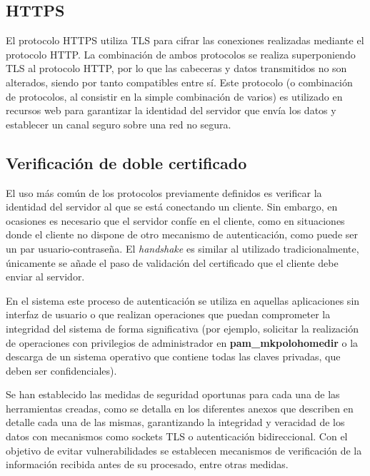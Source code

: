 \subsection{HTTPS}

El protocolo HTTPS\cite{rfc2818} utiliza TLS para cifrar las conexiones realizadas mediante el protocolo HTTP. La combinación de ambos protocolos se realiza superponiendo TLS al protocolo HTTP, por lo que las cabeceras y datos transmitidos no son alterados, siendo por tanto compatibles entre sí. Este protocolo (o combinación de protocolos, al consistir en la simple combinación de varios) es utilizado en recursos web para garantizar la identidad del servidor que envía los datos y establecer un canal seguro sobre una red no segura.

\subsection{Verificación de doble certificado}
\label{teoria:autenticacionmutua}
El uso más común de los protocolos previamente definidos es verificar la identidad del servidor al que se está conectando un cliente. Sin embargo, en ocasiones es necesario que el servidor confíe en el cliente, como en situaciones donde el cliente no dispone de otro mecanismo de autenticación, como puede ser un par usuario-contraseña. El \textit{handshake} es similar al utilizado tradicionalmente, únicamente se añade el paso de validación del certificado que el cliente debe enviar al servidor.

En el sistema este proceso de autenticación se utiliza en aquellas aplicaciones sin interfaz de usuario o que realizan operaciones que puedan comprometer la integridad del sistema de forma significativa (por ejemplo, solicitar la realización de operaciones con privilegios de administrador en \textbf{pam\_mkpolohomedir} o la descarga de un sistema operativo que contiene todas las claves privadas, que deben ser confidenciales).


Se han establecido las medidas de seguridad oportunas para cada una de las herramientas creadas, como se detalla en los diferentes anexos que describen en detalle cada una de las mismas, garantizando la integridad y veracidad de los datos con mecanismos como sockets TLS o autenticación bidireccional. Con el objetivo de evitar vulnerabilidades se establecen mecanismos de verificación de la información recibida antes de su procesado, entre otras medidas.

